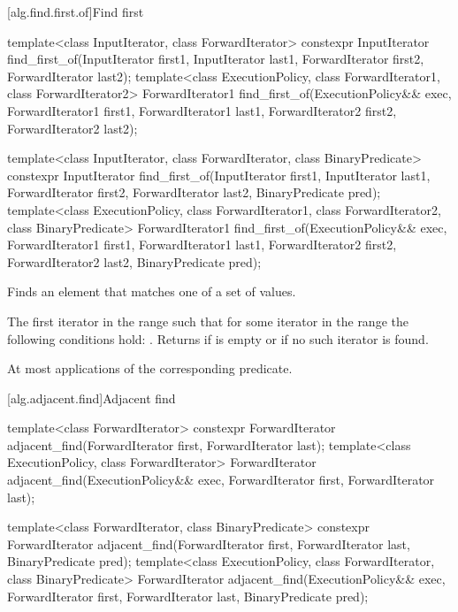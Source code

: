 [alg.find.first.of]{Find first}

%
\begin{itemdecl}
template<class InputIterator, class ForwardIterator>
  constexpr InputIterator
    find_first_of(InputIterator first1, InputIterator last1,
                  ForwardIterator first2, ForwardIterator last2);
template<class ExecutionPolicy, class ForwardIterator1, class ForwardIterator2>
  ForwardIterator1
    find_first_of(ExecutionPolicy&& exec,
                  ForwardIterator1 first1, ForwardIterator1 last1,
                  ForwardIterator2 first2, ForwardIterator2 last2);

template<class InputIterator, class ForwardIterator,
          class BinaryPredicate>
  constexpr InputIterator
    find_first_of(InputIterator first1, InputIterator last1,
                  ForwardIterator first2, ForwardIterator last2,
                  BinaryPredicate pred);
template<class ExecutionPolicy, class ForwardIterator1, class ForwardIterator2,
         class BinaryPredicate>
  ForwardIterator1
    find_first_of(ExecutionPolicy&& exec,
                  ForwardIterator1 first1, ForwardIterator1 last1,
                  ForwardIterator2 first2, ForwardIterator2 last2,
                  BinaryPredicate pred);
\end{itemdecl}

\begin{itemdescr}
\pnum
\effects
Finds an element that matches one of a set of values.

\pnum
\returns
The first iterator
in the range 
such that for some
iterator
in the range 
the following conditions hold:
.
Returns 
if  is empty or
if no such iterator is found.

\pnum
\complexity
At most
applications of the corresponding predicate.
\end{itemdescr}

[alg.adjacent.find]{Adjacent find}

%
\begin{itemdecl}
template<class ForwardIterator>
  constexpr ForwardIterator
    adjacent_find(ForwardIterator first, ForwardIterator last);
template<class ExecutionPolicy, class ForwardIterator>
  ForwardIterator
    adjacent_find(ExecutionPolicy&& exec,
                  ForwardIterator first, ForwardIterator last);

template<class ForwardIterator, class BinaryPredicate>
  constexpr ForwardIterator
    adjacent_find(ForwardIterator first, ForwardIterator last,
                  BinaryPredicate pred);
template<class ExecutionPolicy, class ForwardIterator, class BinaryPredicate>
  ForwardIterator
    adjacent_find(ExecutionPolicy&& exec,
                  ForwardIterator first, ForwardIterator last,
                  BinaryPredicate pred);
\end{itemdecl}

